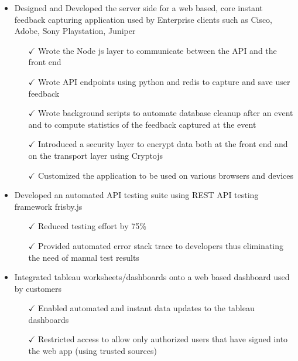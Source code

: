 \begin{itemize} \itemsep -2pt %
 \item Designed and Developed the server side for a web based, core instant feedback capturing application used by Enterprise clients such as Cisco, Adobe, Sony Playstation, Juniper \itemsep -2pt
   \begin{itemize}
     \item[$\checkmark$]  \itemsep -8pt%
   Wrote the Node js layer to communicate between the API and the front end\\
     \item[$\checkmark$]  \itemsep -8pt%
   Wrote API endpoints using python and redis to capture and save user feedback \\
     \item[$\checkmark$]  \itemsep -8pt%
   Wrote background scripts to automate database cleanup after an event and to compute statistics of the feedback captured at the event \\
     \item[$\checkmark$]  \itemsep -8pt%
   Introduced a security layer to encrypt data both at the front end and on the transport layer using Cryptojs\\
    \item[$\checkmark$]  \itemsep -8pt%
   Customized the application to be used on various browsers and devices\\
      \end{itemize}       
\end{itemize}

\begin{itemize} \itemsep -2pt %
 \item Developed an automated API testing suite using REST API testing framework frisby.js \itemsep -2pt
   \begin{itemize}
     \item[$\checkmark$]  \itemsep -8pt%
   Reduced testing effort by 75\%\\
     \item[$\checkmark$]  \itemsep -8pt%
   Provided automated error stack trace to developers thus eliminating the need of manual test results\\
      \end{itemize}       
\end{itemize}

\begin{itemize} \itemsep -2pt %
 \item Integrated tableau worksheets/dashboards onto a web based dashboard used by customers \itemsep -2pt
   \begin{itemize}
     \item[$\checkmark$]  \itemsep -8pt%
   Enabled automated and instant data updates to the tableau dashboards\\
     \item[$\checkmark$]  \itemsep -8pt%
  Restricted access to allow only authorized users that have signed into the web app (using trusted sources) \\
      \end{itemize}       
\end{itemize}

